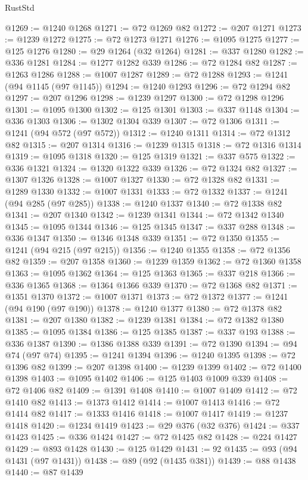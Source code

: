 \begin{lexlean}{RustStd}
\begin{coremodule}
@1269 := @1240 @1268
@1271 := @72 @1269 @82
@1272 := @207 @1271
@1273 := @1239 @1272
@1275 := @72 @1273 @1271
@1276 := @1095 @1275
@1277 := @125 @1276
@1280 := @29 @1264 (@32 @1264)
@1281 := @337 @1280
@1282 := @336 @1281
@1284 := @1277 @1282 @339
@1286 := @72 @1284 @82
@1287 := @1263 @1286
@1288 := @1007 @1287
@1289 := @72 @1288
@1293 := @1241 (@94 @1145 (@97 @1145))
@1294 := @1240 @1293
@1296 := @72 @1294 @82
@1297 := @207 @1296
@1298 := @1239 @1297
@1300 := @72 @1298 @1296
@1301 := @1095 @1300
@1302 := @125 @1301
@1303 := @337 @1148
@1304 := @336 @1303
@1306 := @1302 @1304 @339
@1307 := @72 @1306
@1311 := @1241 (@94 @572 (@97 @572))
@1312 := @1240 @1311
@1314 := @72 @1312 @82
@1315 := @207 @1314
@1316 := @1239 @1315
@1318 := @72 @1316 @1314
@1319 := @1095 @1318
@1320 := @125 @1319
@1321 := @337 @575
@1322 := @336 @1321
@1324 := @1320 @1322 @339
@1326 := @72 @1324 @82
@1327 := @1307 @1326
@1328 := @1007 @1327
@1330 := @72 @1328 @82
@1331 := @1289 @1330
@1332 := @1007 @1331
@1333 := @72 @1332
@1337 := @1241 (@94 @285 (@97 @285))
@1338 := @1240 @1337
@1340 := @72 @1338 @82
@1341 := @207 @1340
@1342 := @1239 @1341
@1344 := @72 @1342 @1340
@1345 := @1095 @1344
@1346 := @125 @1345
@1347 := @337 @288
@1348 := @336 @1347
@1350 := @1346 @1348 @339
@1351 := @72 @1350
@1355 := @1241 (@94 @215 (@97 @215))
@1356 := @1240 @1355
@1358 := @72 @1356 @82
@1359 := @207 @1358
@1360 := @1239 @1359
@1362 := @72 @1360 @1358
@1363 := @1095 @1362
@1364 := @125 @1363
@1365 := @337 @218
@1366 := @336 @1365
@1368 := @1364 @1366 @339
@1370 := @72 @1368 @82
@1371 := @1351 @1370
@1372 := @1007 @1371
@1373 := @72 @1372
@1377 := @1241 (@94 @190 (@97 @190))
@1378 := @1240 @1377
@1380 := @72 @1378 @82
@1381 := @207 @1380
@1382 := @1239 @1381
@1384 := @72 @1382 @1380
@1385 := @1095 @1384
@1386 := @125 @1385
@1387 := @337 @193
@1388 := @336 @1387
@1390 := @1386 @1388 @339
@1391 := @72 @1390
@1394 := @94 @74 (@97 @74)
@1395 := @1241 @1394
@1396 := @1240 @1395
@1398 := @72 @1396 @82
@1399 := @207 @1398
@1400 := @1239 @1399
@1402 := @72 @1400 @1398
@1403 := @1095 @1402
@1406 := @125 @1403 @1009 @339
@1408 := @72 @1406 @82
@1409 := @1391 @1408
@1410 := @1007 @1409
@1412 := @72 @1410 @82
@1413 := @1373 @1412
@1414 := @1007 @1413
@1416 := @72 @1414 @82
@1417 := @1333 @1416
@1418 := @1007 @1417
@1419 := @1237 @1418
@1420 := @1234 @1419
@1423 := @29 @376 (@32 @376)
@1424 := @337 @1423
@1425 := @336 @1424
@1427 := @72 @1425 @82
@1428 := @224 @1427
@1429 := @893 @1428
@1430 := @125 @1429
@1431 := 92
@1435 := @93 (@94 @1431 (@97 @1431))
@1438 := @89 (@92 (@1435 @381))
@1439 := @88 @1438
@1440 := @87 @1439

\end{coremodule}
\end{lexlean}

